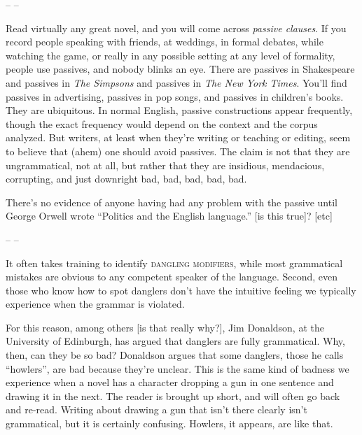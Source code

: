             \begin{center}
                -- --
            \end{center}
            
            Read virtually any great novel, and you will come across \textit{passive clauses}. If you record people speaking with friends, at weddings, in formal debates, while watching the game, or really in any possible setting at any level of formality, people use passives, and nobody blinks an eye. There are passives in Shakespeare and passives in \textit{The Simpsons} and passives in \textit{The New York Times}. You'll find passives in advertising, passives in pop songs, and passives in children's books. They are ubiquitous. In normal English, passive constructions appear frequently, though the exact frequency would depend on the context and the corpus analyzed. But writers, at least when they're writing or teaching or editing, seem to believe that 
             (ahem) one should avoid passives. The claim is not that they are ungrammatical, not at all, but rather that they are insidious, mendacious, corrupting, and just downright bad, bad, bad, bad, bad.

            There's no evidence of anyone having had any problem with the passive until George Orwell wrote \enquote{Politics and the English language.} [is this true]? [etc]

            \begin{center}
                -- --
            \end{center}
            
            It often takes training to identify \textsc{dangling modifiers}, while most grammatical mistakes are obvious to any competent speaker of the language. Second, even those who know how to spot danglers don't have the intuitive feeling we typically experience when the grammar is violated.
            
            For this reason, among others [is that really why?], Jim Donaldson, at the University of Edinburgh, has argued that danglers are fully grammatical. Why, then, can they be so bad? Donaldson argues that some danglers, those he calls \enquote{howlers}, are bad because they're unclear. This is the same kind of badness we experience when a novel has a character dropping a gun in one sentence and drawing it in the next. The reader is brought up short, and will often go back and re-read. Writing about drawing a gun that isn't there clearly isn't grammatical, but it is certainly confusing. Howlers, it appears, are like that.



